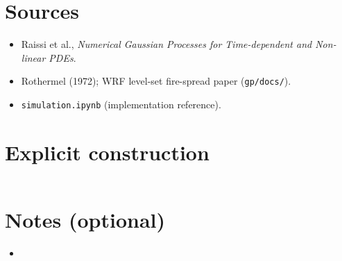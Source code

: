 \documentclass[11pt]{article}
\begin{document}
\section{Sources}

\begin{itemize}
  \item Raissi et al., \emph{Numerical Gaussian Processes for Time-dependent and Non-linear PDEs}.
  \item Rothermel (1972); WRF level-set fire-spread paper (\texttt{gp/docs/}).
  \item \texttt{simulation.ipynb} (implementation reference).
\end{itemize}

\appendix
\section{Explicit construction}

\begin{equation}
  \label{eq:appendix-knn}
\end{equation}

\section{Notes (optional)}

\begin{itemize}
  \item %
\end{itemize}
\end{document}
